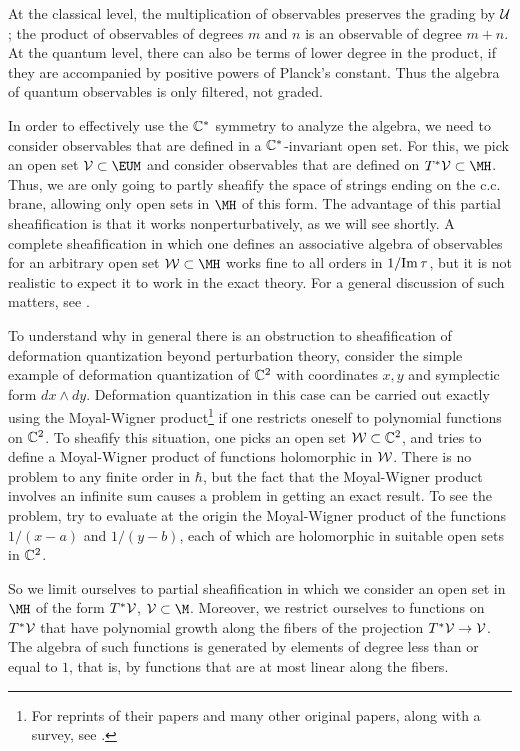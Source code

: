 At the classical level, the multiplication of observables
preserves the grading by ${\cal U}$; the product of observables of
degrees $m$ and $n$ is an observable of degree $m+n$. At the
quantum level, there can also be terms of lower degree in the
product, if they are accompanied by positive powers of  Planck's
constant. Thus the algebra of quantum observables is only
filtered, not graded.

In order to effectively use the $\Bbb{C}^*$ symmetry to analyze
the algebra, we need to consider observables that are defined in a
$\Bbb{C}^*$-invariant open set.  For this, we pick an open set
${{\cal V}}\subset {\EUM}$ and consider observables that are
defined on $T^*{{\cal V}}\subset \MH$.  Thus, we are only going to
partly sheafify the space of strings ending on the c.c. brane,
allowing only open sets in $\MH$ of this form. The advantage of
this partial sheafification is that it works nonperturbatively, as
we will see shortly.  A complete sheafification in which one
defines an associative algebra of observables for an arbitrary
open set ${\cal W}\subset \MH$ works fine to all orders in $1/{\rm
Im}\,\tau$, but it is not realistic to expect it to work in the
exact theory. For a general discussion of such matters, see
\cite{ref138}.

To understand why in general there is an obstruction to
sheafification of deformation quantization beyond perturbation
theory, consider the simple example of deformation quantization of
$\Bbb{C}^{2}$ with coordinates $x,y$ and symplectic form $dx\wedge
dy$. Deformation quantization in this case can be carried out
exactly using the Moyal-Wigner product\footnote{For reprints of their
papers and many other original papers, along with a survey, see
\cite{ref139}.} if one restricts oneself to
polynomial functions on $\Bbb{C}^{2}$. To sheafify this situation,
one picks an open set ${\cal W}\subset\Bbb{C}^{2}$, and tries to
define a Moyal-Wigner product of functions holomorphic in ${\cal
W}$. There is no problem to any finite order in $\hbar$, but the
fact that the Moyal-Wigner product involves an infinite sum causes
a problem in getting an exact result.  To see the problem, try to
evaluate at the origin the Moyal-Wigner product of the functions
$1/(x-a)$ and $1/(y-b)$, each of which are holomorphic in suitable
open sets in $\Bbb{C}^2$.

So we limit ourselves to partial sheafification in which we
consider an open set in $\MH$ of the form $T^*{{\cal V}}$, ${{\cal
V}}\subset\M$.  Moreover, we restrict ourselves to functions on
$T^*{{\cal V}}$ that have polynomial growth along the fibers of
the projection $T^*{{\cal V}}\to{{\cal V}}$.  The algebra of such
functions is generated by elements of degree less than or equal to
$1$, that is, by functions that are at most linear along the
fibers.

